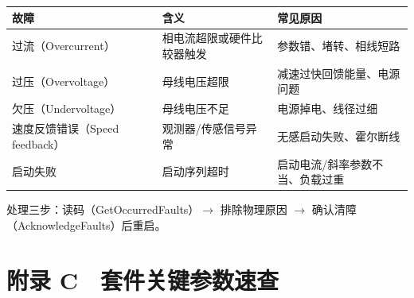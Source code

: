 \documentclass[
  UTF8,
  scheme=plain,
  fontsize=10pt,
  openany
]{ctexbook}
\begin{document}
{\def\LTcaptype{none} %
\begin{longtable}[]{@{}
  >{\raggedright\arraybackslash}p{}
  >{\raggedright\arraybackslash}p{}
  >{\raggedright\arraybackslash}p{}@{}}
\toprule\noalign{}
\begin{minipage}[b]{\linewidth}\raggedright
故障
\end{minipage} & \begin{minipage}[b]{\linewidth}\raggedright
含义
\end{minipage} & \begin{minipage}[b]{\linewidth}\raggedright
常见原因
\end{minipage} \\
\midrule\noalign{}
\endhead
\bottomrule\noalign{}
\endlastfoot
过流（Overcurrent） & 相电流超限或硬件比较器触发 &
参数错、堵转、相线短路 \\
过压（Overvoltage） & 母线电压超限 & 减速过快回馈能量、电源问题 \\
欠压（Undervoltage） & 母线电压不足 & 电源掉电、线径过细 \\
速度反馈错误（Speed feedback） & 观测器/传感信号异常 &
无感启动失败、霍尔断线 \\
启动失败 & 启动序列超时 & 启动电流/斜率参数不当、负载过重 \\
\end{longtable}
}

处理三步：读码（GetOccurredFaults）\(\rightarrow\) 排除物理原因
\(\rightarrow\) 确认清障（AcknowledgeFaults）后重启。

\section*{附录
C　套件关键参数速查}\label{ux9644ux5f55-c-ux5957ux4ef6ux5173ux952eux53c2ux6570ux901fux67e5}
\end{document}

